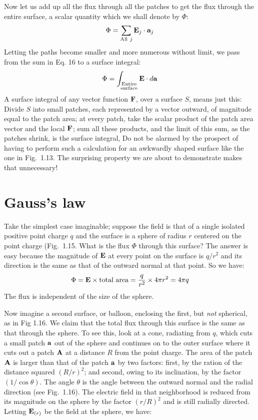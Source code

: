 Now let us add up all the flux through all the patches to get the
flux through the entire surface, a scalar quantity which we shall
denote by $\Phi$:
\begin{equation} 
  \Phi= \sum\limits_{\text{All}~j}\mathbf{E}_j \cdot \mathbf{a}_j 
\end{equation}
Letting the paths become smaller and more numerous without limit, we
pass from the sum in Eq. 16 to a surface integral:
\begin{equation}
  \Phi= \int\nolimits_{\substack{\text{Entire}\\\text{surface}}}\mathbf{E} \cdot d\mathbf{a}
\end{equation}
A surface integral of any vector function $\mathbf{F}$, over a surface
$S$, means just this: Divide $S$ into small patches, each represented
by a vector outward, of magnitude equal to the patch area; at every
patch, take the scalar product of the patch area vector and the local
$\mathbf{F}$; sum all these products, and the limit of this sum, as the
patches shrink, is the surface integral, Do not be alarmed by the
prospect of having to perform such a calculation for an awkwardly
shaped surface like the one in Fig.~1.13. The surprising property
we are about to demonstrate makes that unnecessary!

\section{Gauss's law}

Take the simplest case imaginable; suppose the field is that of a
single isolated positive point charge $q$ and the surface is a sphere
of radius $r$ centered on the point charge (Fig.~1.15. What is the
flux $\Phi$ through this surface? The answer is easy because the
magnitude of $\mathbf{E}$ at every point on the surface is $q/r^2$ and its
direction is the same as that of the outward normal at that point.
So we have:
\begin{equation} 
  \Phi =  {\mathbf{E}}\times \text{total area} = \frac{q}{r^2} \times 4\pi r^2 =  4\pi q 
\end{equation}
The flux is independent of the size of the sphere.


Now imagine a second surface, or balloon, enclosing the first, but
\emph{not} spherical, as in Fig 1.16. We claim that the total flux
through this surface is the same as that through the sphere.
To see this, look at a cone, radiating from $q$, which cuts a small
patch $\mathbf{a}$ out of the sphere and continues on to the outer surface
where it cuts out a patch $\mathbf{A}$ at a distance $R$ from the point
charge. The area of the patch $\mathbf{A}$ is larger than that of the patch
$\mathbf{a}$ by two factors: first, by the ration of the distance squared
$(R/r)^2$; and second, owing to its inclination, by the factor
$(1/\cos\theta)$. The angle $\theta$ is the angle between the outward
normal and the radial direction (see Fig.~1.16). The electric field
in that neighborhood is reduced from its magnitude on the sphere by
the factor $(r/R)^2$ and is still radially directed.
Letting $\mathbf{E}_{(r)}$ be the field at the sphere,
we have:


